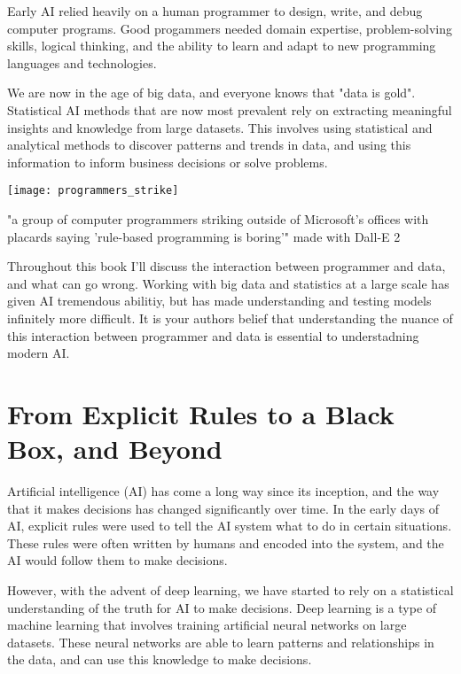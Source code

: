 Early AI relied heavily on a human programmer to design, write, and debug computer programs. Good progammers needed domain expertise, problem-solving skills, logical thinking, and the ability to learn and adapt to new programming languages and technologies.

We are now in the age of big data, and everyone knows that "data is gold". Statistical AI methods that are now most prevalent rely on extracting meaningful insights and knowledge from large datasets. This involves using statistical and analytical methods to discover patterns and trends in data, and using this information to inform business decisions or solve problems. 

\begin{marginfigure}[-5.5cm]
        \texttt{[image: programmers\_strike]}
        \caption{"a group of computer programmers striking outside of Microsoft's offices with placards saying 'rule-based programming is boring'" made with Dall-E 2}
\end{marginfigure}

Throughout this book I'll discuss the interaction between programmer and data, and what can go wrong. Working with big data and statistics at a large scale has given AI tremendous abilitiy, but has made understanding and testing models infinitely more difficult. It is your authors belief that understanding the nuance of this interaction between programmer and data is essential to understadning modern AI.

\section{From Explicit Rules to a Black Box, and Beyond}

Artificial intelligence (AI) has come a long way since its inception, and the way that it makes decisions has changed significantly over time. In the early days of AI, explicit rules were used to tell the AI system what to do in certain situations. These rules were often written by humans and encoded into the system, and the AI would follow them to make decisions.

However, with the advent of deep learning, we have started to rely on a statistical understanding of the truth for AI to make decisions. Deep learning is a type of machine learning that involves training artificial neural networks on large datasets. These neural networks are able to learn patterns and relationships in the data, and can use this knowledge to make decisions.

